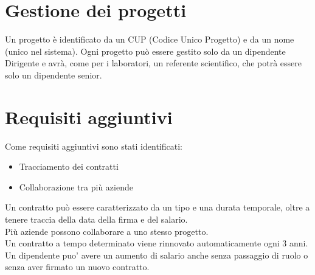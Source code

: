 \section{Gestione dei progetti}
Un progetto è identificato da un CUP (Codice Unico Progetto) e da un nome (unico nel sistema). Ogni progetto può essere gestito solo da un dipendente Dirigente e avrà, come per i laboratori, un referente scientifico, che potrà essere solo un dipendente senior.

\section{Requisiti aggiuntivi}
Come requisiti aggiuntivi sono stati identificati:
\begin{itemize}
    \item Tracciamento dei contratti
    \item Collaborazione tra più aziende
\end{itemize}
Un contratto può essere caratterizzato da un tipo e una durata temporale, oltre a tenere traccia della data della firma e del salario. \\
Più aziende possono collaborare a uno stesso progetto. \\
Un contratto a tempo determinato viene rinnovato automaticamente ogni 3 anni.
Un dipendente puo' avere un aumento di salario anche senza passaggio di ruolo o senza aver firmato un nuovo contratto.
